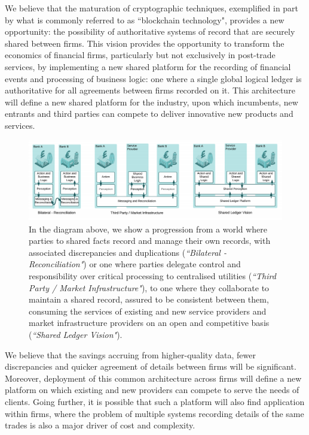 \documentclass{article}
\begin{document}
We believe that the maturation of cryptographic techniques, exemplified in part by what is commonly referred to as ``blockchain technology", provides a new opportunity: the possibility of authoritative systems of record that are securely shared between firms. This vision provides the opportunity to transform the economics of financial firms, particularly but not exclusively in post-trade services, by implementing a new shared platform for the recording of financial events and processing of business logic: one where a single global logical ledger is authoritative for all agreements between firms recorded on it. This architecture will define a new shared platform for the industry, upon which incumbents, new entrants and third parties can compete to deliver innovative new products and services. 

\begin{figure}[H]
\includegraphics[scale=.5, center]{sharedlogic} 
\caption{In the diagram above, we show a progression from a world where parties to shared facts record and manage their own records, with associated discrepancies and duplications (\textit{``Bilateral - Reconciliation"}) or one where parties delegate control and responsibility over critical processing to centralised utilities (\textit{``Third Party / Market Infrastructure"}), to one where they collaborate to maintain a shared record, assured to be consistent between them, consuming the services of existing and new service providers and market infrastructure providers on an open and competitive basis (\textit{``Shared Ledger Vision"}).}
\end{figure}


We believe that the savings accruing from higher-quality data, fewer discrepancies and quicker agreement of details between firms will be significant. Moreover, deployment of this common architecture across firms will define a new platform on which existing and new providers can compete to serve the needs of clients. Going further, it is possible that such a platform will also find application within firms, where the problem of multiple systems recording details of the same trades is also a major driver of cost and complexity.
\end{document}
